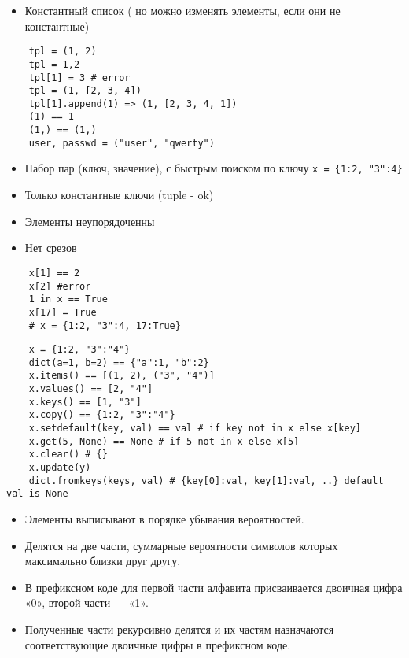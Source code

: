 \documentclass{article}
\begin{document}
\begin{itemize}
    \item Константный список ( но можно изменять элементы, если они не константные)
\end{itemize}
\vspace{15pt}
\begin{lstlisting}
    tpl = (1, 2)
    tpl = 1,2
    tpl[1] = 3 # error
    tpl = (1, [2, 3, 4])
    tpl[1].append(1) => (1, [2, 3, 4, 1])
    (1) == 1
    (1,) == (1,)
    user, passwd = ("user", "qwerty") 
\end{lstlisting}
\newpage

\begin{itemize}
    \item Набор пар (ключ, значение), с быстрым поиском по ключу
    \lstinline$x = {1:2, "3":4}$
    \item Только константные ключи (tuple - ok)
    \item Элементы неупорядоченны
    \item Нет срезов
\end{itemize}
\vspace{15pt}
\begin{lstlisting}
    x[1] == 2
    x[2] #error
    1 in x == True
    x[17] = True
    # x = {1:2, "3":4, 17:True}
\end{lstlisting}
\newpage

\vspace{15pt}
\begin{lstlisting}
    x = {1:2, "3":"4"}
    dict(a=1, b=2) == {"a":1, "b":2}
    x.items() == [(1, 2), ("3", "4")]
    x.values() == [2, "4"]
    x.keys() == [1, "3"]
    x.copy() == {1:2, "3":"4"}
    x.setdefault(key, val) == val # if key not in x else x[key]
    x.get(5, None) == None # if 5 not in x else x[5]
    x.clear() # {}
    x.update(y)
    dict.fromkeys(keys, val) # {key[0]:val, key[1]:val, ..} default val is None
\end{lstlisting}
\newpage

\begin{itemize}
    \item Элементы выписывают в порядке убывания вероятностей.
    \item Делятся на две части, суммарные вероятности символов которых максимально близки друг другу.
    \item В префиксном коде для первой части алфавита присваивается двоичная цифра «0», второй части — «1».
    \item Полученные части рекурсивно делятся и их частям назначаются соответствующие двоичные цифры в префиксном коде.
\end{itemize}
\newpage
\end{document}
